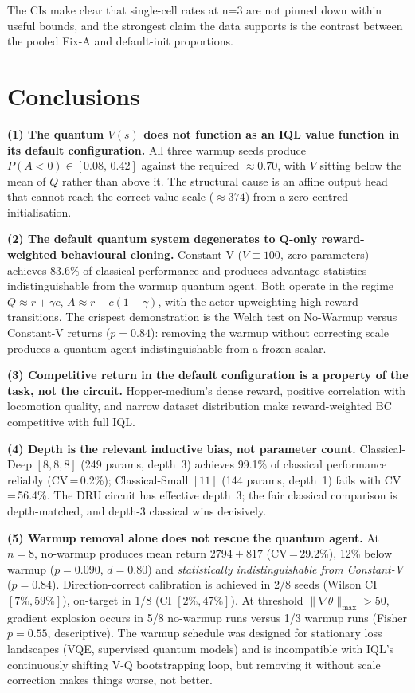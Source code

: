 \documentclass[10pt,a4paper]{article}
\begin{document}
The CIs make clear that single-cell rates at n=3 are not pinned down within
useful bounds, and the strongest claim the data supports is the contrast
between the pooled Fix-A and default-init proportions.

\section{Conclusions}

\textbf{(1) The quantum $V(s)$ does not function as an IQL value function in
its default configuration.}
All three warmup seeds produce $P(A{<}0)\in[0.08,\,0.42]$ against the required
$\approx0.70$, with $V$ sitting below the mean of $Q$ rather than above it.
The structural cause is an affine output head that cannot reach the correct
value scale ($\approx374$) from a zero-centred initialisation.

\textbf{(2) The default quantum system degenerates to Q-only reward-weighted
behavioural cloning.}
Constant-V ($V\equiv100$, zero parameters) achieves 83.6\% of classical
performance and produces advantage statistics indistinguishable from the
warmup quantum agent. Both operate in the regime $Q\approx r+\gamma c$,
$A\approx r-c(1-\gamma)$, with the actor upweighting high-reward transitions.
The crispest demonstration is the Welch test on No-Warmup versus Constant-V
returns ($p=0.84$): removing the warmup without correcting scale produces a
quantum agent indistinguishable from a frozen scalar.

\textbf{(3) Competitive return in the default configuration is a property of
the task, not the circuit.}
Hopper-medium's dense reward, positive correlation with locomotion quality,
and narrow dataset distribution make reward-weighted BC competitive with full
IQL.

\textbf{(4) Depth is the relevant inductive bias, not parameter count.}
Classical-Deep $[8,8,8]$ (249 params, depth~3) achieves 99.1\% of classical
performance reliably (CV\,=\,0.2\%); Classical-Small $[11]$ (144 params,
depth~1) fails with CV\,=\,56.4\%.
The DRU circuit has effective depth~3; the fair classical comparison is
depth-matched, and depth-3 classical wins decisively.

\textbf{(5) Warmup removal alone does not rescue the quantum agent.}
At $n=8$, no-warmup produces mean return $2794\pm817$ (CV\,=\,29.2\%), 12\%
below warmup ($p=0.090$, $d=0.80$) and \emph{statistically indistinguishable
from Constant-V} ($p=0.84$).
Direction-correct calibration is achieved in 2/8 seeds (Wilson CI
$[7\%,59\%]$), on-target in 1/8 (CI $[2\%,47\%]$).
At threshold $\|\nabla\theta\|_\text{max}>50$, gradient explosion occurs in
5/8 no-warmup runs versus 1/3 warmup runs (Fisher $p=0.55$, descriptive).
The warmup schedule was designed for stationary loss landscapes (VQE,
supervised quantum models) and is incompatible with IQL's continuously
shifting V-Q bootstrapping loop, but removing it without scale correction
makes things worse, not better.
\end{document}
